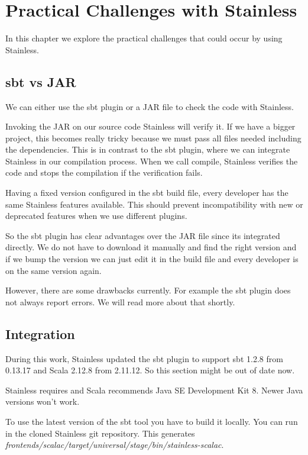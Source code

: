 \chapter{Practical Challenges with Stainless}
\label{chap:appendix_arb}

In this chapter we explore the practical challenges that could occur by using Stainless.


\section{sbt vs JAR}

We can either use the sbt plugin or a JAR file to check the code with Stainless.

Invoking the JAR on our source code Stainless will verify it.
If we have a bigger project, this becomes really tricky because we must pass all files needed including the dependencies.
This is in contrast to the sbt plugin, where we can integrate Stainless in our compilation process.
When we call compile, Stainless verifies the code and stops the compilation if the verification fails.

Having a fixed version configured in the sbt build file, every developer has the same Stainless features available.
This should prevent incompatibility with new or deprecated features when we use different plugins.

So the sbt plugin has clear advantages over the JAR file since its integrated directly.
We do not have to download it manually and find the right version and if we bump the version we can just edit it in the build file and every developer is on the same version again.

However, there are some drawbacks currently.
For example the sbt plugin does not always report errors.
We will read more about that shortly.


\section{Integration}

During this work, Stainless updated the sbt plugin to support sbt 1.2.8 from 0.13.17 and Scala 2.12.8 from 2.11.12.
So this section might be out of date now.

Stainless requires and Scala recommends Java SE Development Kit 8.
Newer Java versions won't work.

To use the latest version of the sbt tool you have to build it locally.
You can run  in the cloned Stainless git repository.
This generates \emph{frontends/scalac/target/universal/stage/bin/stainless-scalac}.

